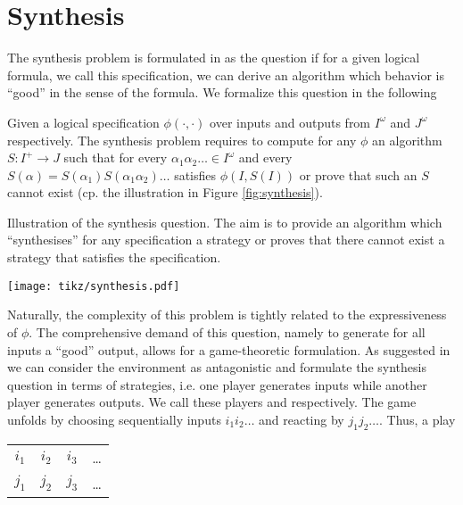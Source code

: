 \chapter{Synthesis}
\label{chapter:synthesis}
The synthesis problem is formulated in \cite{Church} as the question if for a 
given logical formula, we call this specification, we can derive an algorithm
which behavior is \enquote{good} in the sense of the formula. We formalize this
question in the following
\begin{definition}
  Given a logical specification  $\phi(\cdot, \cdot)$ over inputs and
  outputs from $I^{\omega}$ and $J^{\omega}$ respectively. The synthesis
  problem requires to compute for any $\phi$ an algorithm
  $S:I^{+}\rightarrow J$ such that for every
  $\alpha_{1}\alpha_{2}\dots\in I^{\omega}$ and every
  $S(\alpha) = S(\alpha_{1})S(\alpha_{1}\alpha_{2})\dots$ satisfies
  $\phi(I, S(I))$ or prove that such an $S$ cannot exist (cp. the
  illustration in Figure \ref{fig:synthesis}).
\end{definition}
\begin{drawing}
  \caption{Illustration of the synthesis question. The aim is to provide an 
  algorithm which \enquote{synthesises} for any specification a strategy or 
  proves that there cannot exist a strategy that satisfies the specification.}
  \label{fig:synthesis}
  \begin{center}
    \texttt{[image: tikz/synthesis.pdf]}
  \end{center}
\end{drawing}
Naturally, the complexity of this problem is tightly related to the 
expressiveness of $\phi$. The comprehensive demand of this question, namely
to generate for all inputs a \enquote{good} output, allows for a
game-theoretic formulation. As suggested in \cite{SeqCondStrat} we can consider
the environment as antagonistic and formulate the synthesis question in terms
of strategies, i.e. one player generates inputs while another player generates
outputs. We call these players  and \outputp{} respectively. The game
unfolds by  choosing sequentially inputs $i_{1}i_{2}\dots$ and 
\outputp{} reacting by $j_{1}j_{2}\dots$. Thus, a play
\begin{center}
  \begin{tabular}{cccc}
    $i_{1}$ & $i_{2}$ & $i_{3}$ & \dots\\
    $j_{1}$ & $j_{2}$ & $j_{3}$ & \dots
  \end{tabular}
\end{center}
